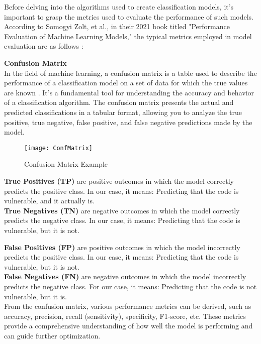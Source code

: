 Before delving into the algorithms used to create classification models, it's important to grasp the metrics used to evaluate the performance of such models.\\

According to Somogyi Zolt, et al., in their 2021 book titled "Performance Evaluation of Machine Learning Models," the typical metrics employed in model evaluation are as follows \cite{Somogyi2021}:

\textbf{{\Large Confusion Matrix}} \\

In the field of machine learning, a confusion matrix is a table used to describe the performance of a classification model on a set of data for which the true values are known \cite{Somogyi2021}. It's a fundamental tool for understanding the accuracy and behavior of a classification algorithm. The confusion matrix presents the actual and predicted classifications in a tabular format, allowing you to analyze the true positive, true negative, false positive, and false negative predictions made by the model.

\begin{figure}[ht]
	\centering
	\texttt{[image: ConfMatrix]}
	  \caption{Confusion Matrix Example}
  \label{fig:ConfMatrix}
\end{figure}


\textbf{True Positives (TP)} are positive outcomes in which the model correctly predicts the positive class. In our case, it means: Predicting that the code is vulnerable, and it actually is.\\

\textbf{True Negatives (TN)} are negative outcomes in which the model correctly predicts the negative class. In our case, it means: Predicting that the code is vulnerable, but it is not.

\textbf{False Positives (FP)} are positive outcomes in which the model incorrectly predicts the positive class. In our case, it means: Predicting that the code is vulnerable, but it is not. \\

\textbf{False Negatives (FN)} are negative outcomes in which the model incorrectly predicts the negative class. For our case, it means: Predicting that the code is not vulnerable, but it is.\\

From the confusion matrix, various performance metrics can be derived, such as accuracy, precision, recall (sensitivity), specificity, F1-score, etc. These metrics provide a comprehensive understanding of how well the model is performing and can guide further optimization.

